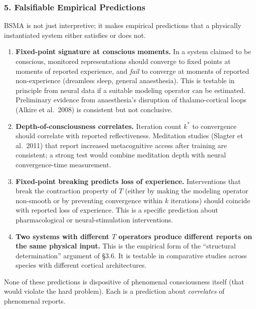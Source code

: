 \documentclass[
  11pt,
  a4paper,
]{article}
\begin{document}
\subsubsection{5. Falsifiable Empirical
Predictions}\label{falsifiable-empirical-predictions}

BSMA is not just interpretive; it makes empirical predictions that a
physically instantiated system either satisfies or does not.

\begin{enumerate}
\def\labelenumi{\arabic{enumi}.}
\item
  \textbf{Fixed-point signature at conscious moments.} In a system
  claimed to be conscious, monitored representations should converge to
  fixed points at moments of reported experience, and \emph{fail} to
  converge at moments of reported non-experience (dreamless sleep,
  general anaesthesia). This is testable in principle from neural data
  if a suitable modeling operator can be estimated. Preliminary evidence
  from anaesthesia's disruption of thalamo-cortical loops (Alkire et
  al.~2008) is consistent but not conclusive.
\item
  \textbf{Depth-of-consciousness correlates.} Iteration count \(k^*\) to
  convergence should correlate with reported reflectiveness. Meditation
  studies (Slagter et al.~2011) that report increased metacognitive
  access after training are consistent; a strong test would combine
  meditation depth with neural convergence-time measurement.
\item
  \textbf{Fixed-point breaking predicts loss of experience.}
  Interventions that break the contraction property of \(T\) (either by
  making the modeling operator non-smooth or by preventing convergence
  within \(k\) iterations) should coincide with reported loss of
  experience. This is a specific prediction about pharmacological or
  neural-stimulation interventions.
\item
  \textbf{Two systems with different \(T\) operators produce different
  reports on the same physical input.} This is the empirical form of the
  ``structural determination'' argument of §3.6. It is testable in
  comparative studies across species with different cortical
  architectures.
\end{enumerate}

None of these predictions is dispositive of phenomenal consciousness
itself (that would violate the hard problem). Each is a prediction about
\emph{correlates} of phenomenal reports.
\end{document}
